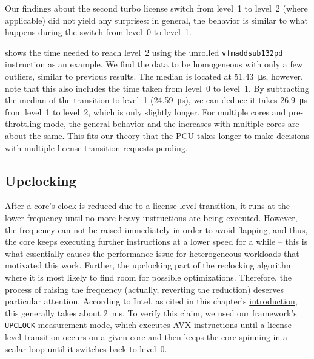 Our findings about the second turbo license switch from level~1 to level~2 (where applicable) did not yield any surprises: in general, the behavior is similar to what happens during the switch from level~0 to level~1.

 shows the time needed to reach level~2 using the unrolled \texttt{vfmaddsub132pd} instruction as an example. We find the data to be homogeneous with only a few outliers, similar to previous results. The median is located at \SI{51.43}{\micro\second}, however, note that this also includes the time taken from level~0 to level~1. By subtracting the median of the transition to level~1 (\SI{24.59}{\micro\second}), we can deduce it takes \SI{26.9}{\micro\second} from level~1 to level~2, which is only slightly longer. For multiple cores and pre-throttling mode, the general behavior and the increases with multiple cores are about the same. This fits our theory that the \gls{PCU} takes longer to make decisions with multiple license transition requests pending.

\subsection{Upclocking}
\label{sec:analysis:results:upclocking}

After a core's clock is reduced due to a license level transition, it runs at the lower frequency until no more heavy instructions are being executed. However, the frequency can not be raised immediately in order to avoid flapping, and thus, the core keeps executing further instructions at a lower speed for a while -- this is what essentially causes the performance issue for heterogeneous workloads that motivated this work. Further, the upclocking part of the reclocking algorithm where it is most likely to find room for possible optimizations. Therefore, the process of raising the frequency (actually, reverting the reduction) deserves particular attention. According to Intel, as cited in this chapter's \hyperref[sec:analysis]{introduction}, this generally takes about \SI{2}{\milli\second}. To verify this claim, we used our framework's \hyperref[sec:analysis:design:measurementmodes:upclock]{\texttt{UPCLOCK}} measurement mode, which executes \gls{AVX} instructions until a license level transition occurs on a given core and then keeps the core spinning in a scalar loop until it switches back to level~0.

